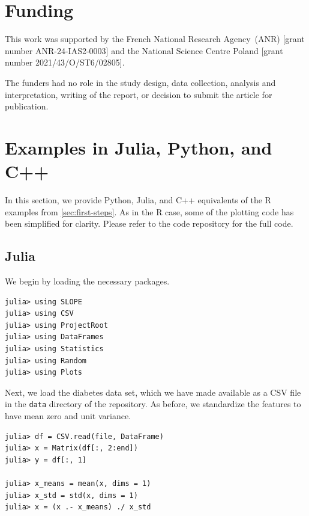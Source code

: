 \documentclass[a4paper,fleqn]{cas-sc}
\begin{document}
\section*{Funding}

This work was supported by the French National Research Agency~(ANR) [grant
number ANR-24-IAS2-0003] and the National Science Centre Poland [grant number
2021/43/O/ST6/02805].

The funders had no role in the study design, data collection, analysis and
interpretation, writing of the report, or decision to submit the article for
publication.

\clearpage

\appendix
{}

\section{Examples in Julia, Python, and C++}%

\label{sec:examples-julia-python}

In this section, we provide \textsf{Python}, \textsf{Julia}, and \textsf{C++}
equivalents of the \textsf{R} examples from \autoref{sec:first-steps}. As in the
\textsf{R} case, some of the plotting code has been simplified for clarity.
Please refer to the code repository for the full code.

\subsection{Julia}

We begin by loading the necessary packages.

\begin{Verbatim}
julia> using SLOPE
julia> using CSV
julia> using ProjectRoot
julia> using DataFrames
julia> using Statistics
julia> using Random
julia> using Plots
  \end{Verbatim}

Next, we load the diabetes data set, which we have made available as a CSV file
in the \texttt{data} directory of the repository. As before, we standardize the
features to have mean zero and unit variance.

\begin{Verbatim}
julia> df = CSV.read(file, DataFrame)
julia> x = Matrix(df[:, 2:end])
julia> y = df[:, 1]

julia> x_means = mean(x, dims = 1)
julia> x_std = std(x, dims = 1)
julia> x = (x .- x_means) ./ x_std
\end{Verbatim}
\end{document}
